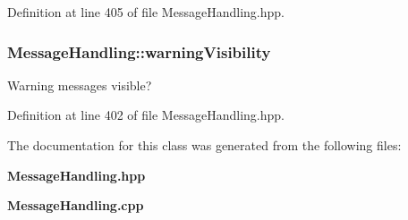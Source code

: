 Definition at line 405 of file MessageHandling.hpp.

\subsubsection[{warningVisibility}]{ {\bf MessageHandling::warningVisibility}\hspace{0.3cm}{\ttfamily  [protected]}}\label{classMessageHandling_af715e377af244418a8003b172c8bdf91}
Warning messages visible? 

Definition at line 402 of file MessageHandling.hpp.



The documentation for this class was generated from the following files:\begin{DoxyCompactItemize}
\item 
{\bf MessageHandling.hpp}\item 
{\bf MessageHandling.cpp}\end{DoxyCompactItemize}
